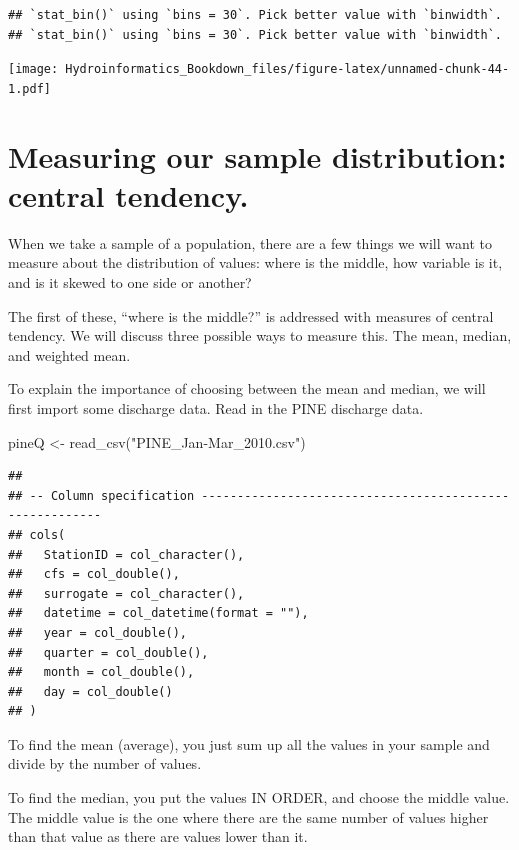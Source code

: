 \documentclass[
]{book}
\newenvironment{Shaded}{\begin{snugshade}}{\end{snugshade}}
\newcommand{\FunctionTok}[1]{\textcolor[rgb]{0.00,0.00,0.00}{#1}}
\newcommand{\NormalTok}[1]{#1}
\newcommand{\OtherTok}[1]{\textcolor[rgb]{0.56,0.35,0.01}{#1}}
\newcommand{\StringTok}[1]{\textcolor[rgb]{0.31,0.60,0.02}{#1}}
\begin{document}
\begin{verbatim}
## `stat_bin()` using `bins = 30`. Pick better value with `binwidth`.
## `stat_bin()` using `bins = 30`. Pick better value with `binwidth`.
\end{verbatim}

\texttt{[image: Hydroinformatics\_Bookdown\_files/figure-latex/unnamed-chunk-44-1.pdf]}

\hypertarget{measuring-our-sample-distribution-central-tendency.}{%
\section{Measuring our sample distribution: central tendency.}\label{measuring-our-sample-distribution-central-tendency.}}

When we take a sample of a population, there are a few things we will want to measure about the distribution of values: where is the middle, how variable is it, and is it skewed to one side or another?

The first of these, ``where is the middle?'' is addressed with measures of central tendency. We will discuss three possible ways to measure this. The mean, median, and weighted mean.

To explain the importance of choosing between the mean and median, we will first import some discharge data. Read in the PINE discharge data.

\begin{Shaded}
\begin{Highlighting}[]
\NormalTok{pineQ }\OtherTok{\textless{}{-}} \FunctionTok{read\_csv}\NormalTok{(}\StringTok{"PINE\_Jan{-}Mar\_2010.csv"}\NormalTok{)}
\end{Highlighting}
\end{Shaded}

\begin{verbatim}
## 
## -- Column specification --------------------------------------------------------
## cols(
##   StationID = col_character(),
##   cfs = col_double(),
##   surrogate = col_character(),
##   datetime = col_datetime(format = ""),
##   year = col_double(),
##   quarter = col_double(),
##   month = col_double(),
##   day = col_double()
## )
\end{verbatim}

To find the mean (average), you just sum up all the values in your sample and divide by the number of values.

To find the median, you put the values IN ORDER, and choose the middle value. The middle value is the one where there are the same number of values higher than that value as there are values lower than it.
\end{document}
